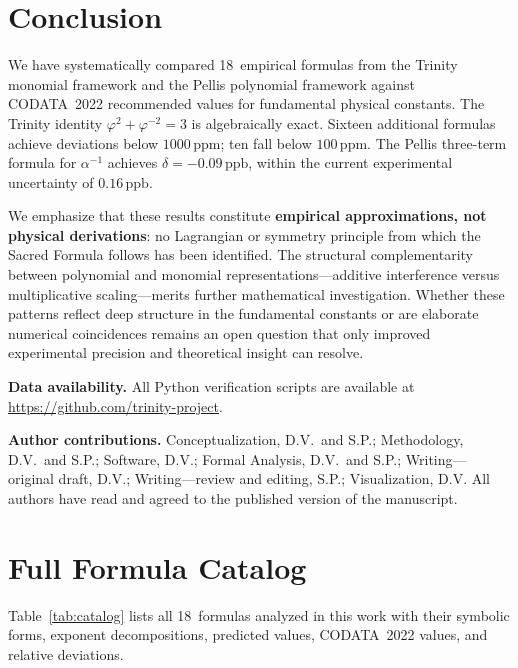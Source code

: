 \documentclass[11pt,a4paper]{article}
\newcommand{\vp}{\varphi}
\newcommand{\ppm}{\,\mathrm{ppm}}
\newcommand{\ppb}{\,\mathrm{ppb}}
\begin{document}
\section{Conclusion}\label{sec:conclusion}

We have systematically compared 18~empirical formulas from the Trinity monomial
framework and the Pellis polynomial framework against CODATA~2022 recommended
values for fundamental physical constants. The Trinity identity
$\vp^{2}+\vp^{-2}=3$ is algebraically exact. Sixteen additional formulas
achieve deviations below $1000\ppm$; ten fall below $100\ppm$. The Pellis
three-term formula for $\alpha^{-1}$ achieves $\delta = -0.09\ppb$, within the
current experimental uncertainty of $0.16\ppb$.

We emphasize that these results constitute \textbf{empirical approximations,
not physical derivations}: no Lagrangian or symmetry principle from which the
Sacred Formula follows has been identified. The structural complementarity
between polynomial and monomial representations---additive interference versus
multiplicative scaling---merits further mathematical investigation. Whether
these patterns reflect deep structure in the fundamental constants or are
elaborate numerical coincidences remains an open question that only improved
experimental precision and theoretical insight can resolve.

\medskip
\noindent\textbf{Data availability.} All Python verification scripts are
available at \url{https://github.com/trinity-project}.

\medskip
\noindent\textbf{Author contributions.}
Conceptualization, D.V.\ and S.P.; Methodology, D.V.\ and S.P.;
Software, D.V.; Formal Analysis, D.V.\ and S.P.;
Writing---original draft, D.V.; Writing---review and editing, S.P.;
Visualization, D.V.
All authors have read and agreed to the published version of the manuscript.

\appendix

\section{Full Formula Catalog}\label{app:catalog}

Table~\ref{tab:catalog} lists all 18~formulas analyzed in this work with
their symbolic forms, exponent decompositions, predicted values, CODATA~2022
values, and relative deviations.
\end{document}
